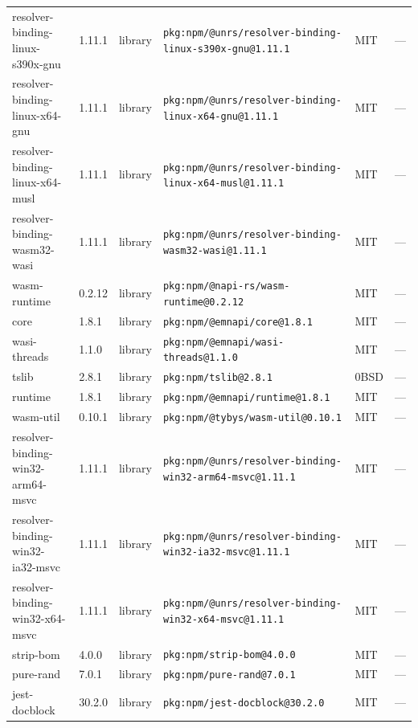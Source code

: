 \documentclass[11pt,a4paper]{article}
\begin{document}
\begin{longtable}{|p{4cm}|p{2cm}|p{1.6cm}|p{5cm}|p{1.5cm}|p{3.5cm}|}
\raggedright resolver-binding-linux-s390x-gnu & 1.11.1 & library & \small\texttt{pkg:npm/@unrs/resolver-binding-linux-s390x-gnu@1.11.1} & MIT & \small — \\
\raggedright resolver-binding-linux-x64-gnu & 1.11.1 & library & \small\texttt{pkg:npm/@unrs/resolver-binding-linux-x64-gnu@1.11.1} & MIT & \small — \\
\raggedright resolver-binding-linux-x64-musl & 1.11.1 & library & \small\texttt{pkg:npm/@unrs/resolver-binding-linux-x64-musl@1.11.1} & MIT & \small — \\
\raggedright resolver-binding-wasm32-wasi & 1.11.1 & library & \small\texttt{pkg:npm/@unrs/resolver-binding-wasm32-wasi@1.11.1} & MIT & \small — \\
\raggedright wasm-runtime & 0.2.12 & library & \small\texttt{pkg:npm/@napi-rs/wasm-runtime@0.2.12} & MIT & \small — \\
\raggedright core & 1.8.1 & library & \small\texttt{pkg:npm/@emnapi/core@1.8.1} & MIT & \small — \\
\raggedright wasi-threads & 1.1.0 & library & \small\texttt{pkg:npm/@emnapi/wasi-threads@1.1.0} & MIT & \small — \\
\raggedright tslib & 2.8.1 & library & \small\texttt{pkg:npm/tslib@2.8.1} & 0BSD & \small — \\
\raggedright runtime & 1.8.1 & library & \small\texttt{pkg:npm/@emnapi/runtime@1.8.1} & MIT & \small — \\
\raggedright wasm-util & 0.10.1 & library & \small\texttt{pkg:npm/@tybys/wasm-util@0.10.1} & MIT & \small — \\
\raggedright resolver-binding-win32-arm64-msvc & 1.11.1 & library & \small\texttt{pkg:npm/@unrs/resolver-binding-win32-arm64-msvc@1.11.1} & MIT & \small — \\
\raggedright resolver-binding-win32-ia32-msvc & 1.11.1 & library & \small\texttt{pkg:npm/@unrs/resolver-binding-win32-ia32-msvc@1.11.1} & MIT & \small — \\
\raggedright resolver-binding-win32-x64-msvc & 1.11.1 & library & \small\texttt{pkg:npm/@unrs/resolver-binding-win32-x64-msvc@1.11.1} & MIT & \small — \\
\raggedright strip-bom & 4.0.0 & library & \small\texttt{pkg:npm/strip-bom@4.0.0} & MIT & \small — \\
\raggedright pure-rand & 7.0.1 & library & \small\texttt{pkg:npm/pure-rand@7.0.1} & MIT & \small — \\
\raggedright jest-docblock & 30.2.0 & library & \small\texttt{pkg:npm/jest-docblock@30.2.0} & MIT & \small — \\

\end{longtable}
\end{document}
